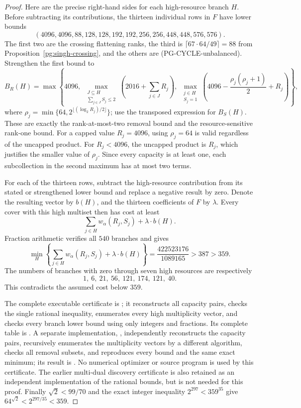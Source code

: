 \begin{proof}
Here are the precise right-hand sides for each high-resource
branch $H$. Before subtracting its contributions, the thirteen
individual rows in $F$ have lower bounds
\[
 (4096,4096,88,128,128,192,192,256,256,
   448,448,576,576).
\]
The first two are the crossing flattening ranks, the third is
$\lceil67\cdot64/49\rceil=88$ from
Proposition~\ref{pg:singh-crossing}, and the others are
(PG-CYCLE-unbalanced). Strengthen the first bound to
\[
 B_R(H)=\max\left\{
 4096,\;
 \max_{\substack{J\subseteq H\\\sum_{j\in J}S_j\leq2}}
       \left(2016+\sum_{j\in J}R_j\right),\;
 \max_{\substack{j\in H\\S_j=1}}
       \left(4096-\frac{\rho_j(\rho_j+1)}2+R_j\right)
 \right\},
\]
where
$\rho_j=\min\{64,2^{\lfloor(\log_2R_j)/2\rfloor}\}$;
use the transposed expression for $B_S(H)$.
These are exactly the rank-at-most-two removal bound and the
resource-sensitive rank-one bound. For a capped value
$R_j=4096$, using $\rho_j=64$ is valid regardless of the
uncapped product. For $R_j<4096$, the uncapped product is
$R_j$, which justifies the smaller value of $\rho_j$.
Since every capacity is at least one, each subcollection in the
second maximum has at most two terms.

For each of the thirteen rows, subtract the high-resource
contribution from its stated or strengthened lower bound and
replace a negative result by zero. Denote the resulting vector
by $b(H)$, and the thirteen coefficients of $F$ by $\lambda$.
Every cover with this high multiset then has cost at least
\[
 \sum_{j\in H}w_\alpha(R_j,S_j)+\lambda\cdot b(H).
 \tag{PG-Q64-branch}
\]
Fraction arithmetic verifies all $540$ branches and gives
\[
 \min_H\left\{\sum_{j\in H}w_\alpha(R_j,S_j)
                       +\lambda\cdot b(H)\right\}
 =\frac{422523176}{1089165}>387>359.
\]
The numbers of branches with zero through seven high resources
are respectively
\[
 1,\ 6,\ 21,\ 56,\ 121,\ 174,\ 121,\ 40.
\]
This contradicts the assumed cost below $359$.

The complete executable certificate is
; it
reconstructs all capacity pairs, checks the single rational
inequality, enumerates every high multiplicity vector, and checks
every branch lower bound using only integers and fractions.
Its complete table is
.
A separate implementation,
, independently
reconstructs the capacity pairs, recursively enumerates the
multiplicity vectors by a different algorithm, checks all
removal subsets, and reproduces every bound and the same exact
minimum; its result is
.
No numerical optimizer or source program is used by this
certificate. The earlier multi-dual discovery certificate is
also retained as an independent implementation of the rational
bounds, but is not needed for this proof.
Finally $\sqrt2<99/70$ and the exact integer inequality
$2^{297}<359^{35}$ give
$64^{\sqrt2}<2^{297/35}<359$.
\end{proof}

